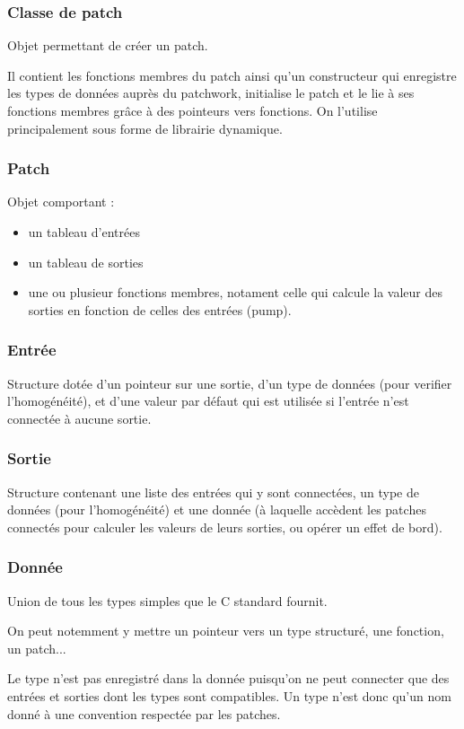 \documentclass[14pt,a4paper]{article}
\begin{document}
\subsubsection{Classe de patch}
\par
Objet permettant de cr\'eer un patch.
\par
Il contient les fonctions membres du patch ainsi qu'un constructeur qui
 enregistre les types de donn\'ees aupr\`es du patchwork, initialise
 le patch et le lie \`a ses fonctions membres gr\^ace \`a des pointeurs
 vers fonctions.
On l'utilise principalement sous forme de librairie dynamique.

\subsubsection {Patch}
Objet comportant :
\begin{itemize}
\item un tableau d'entr\'ees
\item un tableau de sorties
\item une ou plusieur fonctions membres, notament celle qui calcule
 la valeur des sorties en fonction de celles des entr\'ees (pump).
\end{itemize}

\subsubsection {Entr\'ee}
\par
Structure dot\'ee d'un pointeur sur une sortie, d'un type de
 donn\'ees (pour verifier l'homog\'en\'eit\'e), et d'une valeur
 par d\'efaut qui est utilis\'ee si l'entr\'ee n'est connect\'ee
 \`a aucune sortie.

\subsubsection {Sortie}
\par
Structure contenant une liste des entr\'ees qui y sont connect\'ees,
 un type de donn\'ees (pour l'homog\'en\'eit\'e) et une donn\'ee
 (\`a laquelle acc\`edent les patches connect\'es pour calculer les
 valeurs de leurs sorties, ou op\'erer un effet de bord).

\subsubsection{Donn\'ee}
\par
Union de tous les types simples que le C standard fournit.
\\
\par
On peut notemment y mettre un pointeur vers un type structur\'e, une fonction, un patch...
\\
\par
Le type n'est pas enregistr\'e dans la donn\'ee puisqu'on ne peut connecter que des entr\'ees et sorties dont les types sont compatibles. Un type n'est donc qu'un nom donn\'e \`a une convention respect\'ee par les patches.
\end{document}
